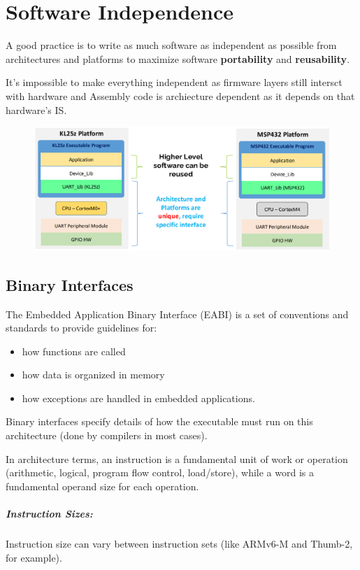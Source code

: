 \chapter{Software Independence}

A good practice is to write as much software as independent as possible from architectures and platforms
to maximize software \textbf{portability} and \textbf{reusability}.

It's impossible to make everything independent as firmware layers still intersct with hardware and
Assembly code is archiecture dependent as it depends on that hardware's IS.

\begin{figure}[H]
    \centering
    \includegraphics[width=0.75\linewidth]{img/image81.png}
\end{figure}

\section{Binary Interfaces}
The Embedded Application Binary Interface (EABI) is a set of conventions and standards to provide
guidelines for:


\begin{itemize}
    \item how functions are called
    \item how data is organized in memory
    \item how exceptions are handled in embedded applications.
\end{itemize}

Binary interfaces specify details of how the executable must run on this architecture (done by compilers in
most cases).

In architecture terms, an instruction is a fundamental unit of work or operation (arithmetic, logical, program
flow control, load/store), while a word is a fundamental operand size for each operation.

\paragraph{Instruction Sizes:} Instruction size can vary between instruction sets (like ARMv6-M and Thumb-2, for example).
